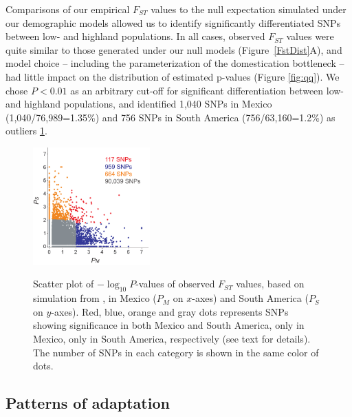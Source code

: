 Comparisons of our empirical $F_{ST}$ values to the null expectation simulated under our demographic models allowed us to identify significantly differentiated SNPs between low- and highland populations. In all cases, observed $F_{ST}$ values were quite similar to those generated under our null models (Figure~\ref{FstDist}A), and model choice -- including the parameterization of the domestication bottleneck -- had little impact on the distribution of estimated p-values (Figure \ref{fig:qq}). We chose $P<0.01$ as an arbitrary cut-off for significant differentiation between low- and highland populations, and identified 1,040 SNPs in Mexico (1,040/76,989=1.35\%) and 756 SNPs in South America (756/63,160=1.2\%) as outliers \ref{PvDist}.

\begin{figure}[tb]   
  \begin{center}
   \vspace{-0mm}
   \includegraphics[width=0.4\textwidth]{fig/Fig6}
   \renewcommand{\baselinestretch}{0.9}
   \vspace{-3mm}
   \caption{Scatter plot of $-\log_10 P$-values of observed $F_{ST}$ values, based on simulation from , in Mexico ($P_M$ on $x$-axes) and South America ($P_S$ on $y$-axes).  
   Red, blue, orange and gray dots represents SNPs showing significance in both Mexico and South America, only in Mexico, only in South America, respectively (see text for details).
   The number of SNPs in each category is shown in the same color of dots.} 
\vspace{-6mm}
    \label{PvDist}
  \end{center}
\end{figure}
%

\subsection*{Patterns of adaptation}

